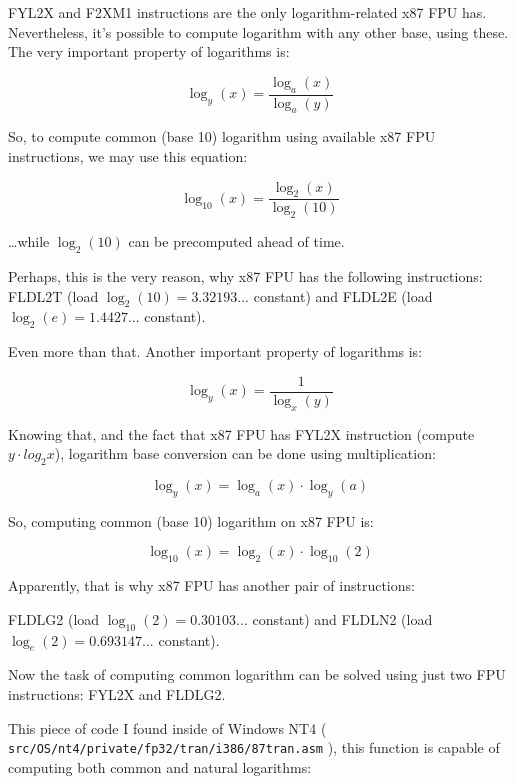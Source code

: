 
FYL2X and F2XM1 instructions are the only logarithm-related x87 FPU has.
Nevertheless, it's possible to compute logarithm with any other base, using these.
The very important property of logarithms is:

\begin{equation}
\log_y (x) = \frac{\log_a (x)}{\log_a (y)}
\end{equation}

So, to compute common (base 10) logarithm using available x87 FPU instructions, we may use this equation:

\begin{equation}
\log_{10} (x) = \frac{\log_2 (x)}{\log_2 (10)}
\end{equation}

\dots while $\log_2(10)$ can be precomputed ahead of time.

Perhaps, this is the very reason, why x87 FPU has the following instructions:
FLDL2T (load $\log_2 (10)=3.32193...$ constant) and FLDL2E (load $\log_2 (e)=1.4427...$ constant).

Even more than that.
Another important property of logarithms is:

\begin{equation}
\log_y (x) = \frac{1}{\log_x (y)}
\end{equation}

Knowing that, and the fact that x87 FPU has FYL2X instruction (compute $y \cdot log_2 x$), logarithm base conversion can be done using multiplication:

\begin{equation}
\log_y (x) = \log_a (x) \cdot \log_y (a)
\end{equation}

So, computing common (base 10) logarithm on x87 FPU is:

\begin{equation}
\log_{10} (x) = \log_2 (x) \cdot \log_{10} (2)
\end{equation}

Apparently, that is why x87 FPU has another pair of instructions:

FLDLG2 (load $\log_{10} (2)=0.30103...$ constant) and FLDLN2 (load $\log_e (2)=0.693147...$ constant).

Now the task of computing common logarithm can be solved using just two FPU instructions: FYL2X and FLDLG2.

This piece of code I found inside of Windows NT4 ( \texttt{src/OS/nt4/private/fp32/tran/i386/87tran.asm} ), 
this function is capable of computing both common and natural logarithms: 

